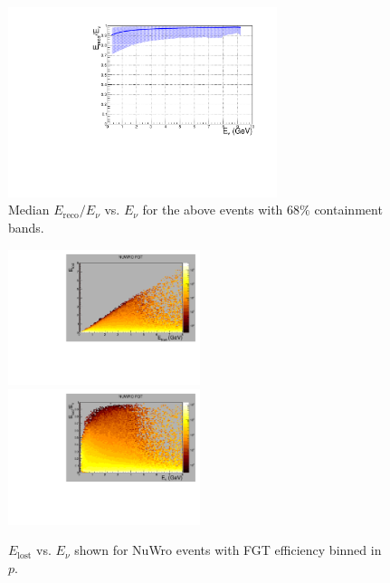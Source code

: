\documentclass{article}
\begin{document}
\begin{figure}[!h]
  \begin{center}
    \includegraphics[width=0.7\textwidth]{plots.old/fig20.pdf}
    \caption{Median $E_{\mathrm{reco}}/E_\nu$ vs. $E_\nu$ for the above events with $68\%$ containment bands.}
  \end{center}
\end{figure}

\begin{figure}[!h]
  \includegraphics[width=0.5\textwidth]{plots.old/fig21.pdf}
  \includegraphics[width=0.5\textwidth]{plots.old/fig22.pdf}
  \caption{$E_{\mathrm{lost}}$ vs. $E_\nu$ shown for NuWro events with FGT efficiency binned in $p$.}
\end{figure}
\end{document}
